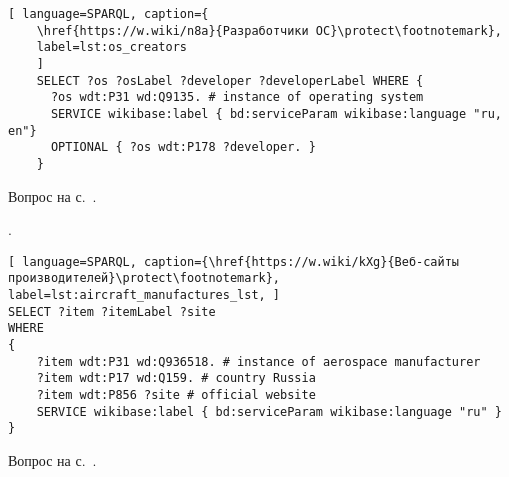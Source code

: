 \begin{task}
	\label{answer:what_system_created}
	
	\begin{lstlisting}[ language=SPARQL, caption={
	\href{https://w.wiki/n8a}{Разработчики ОС}\protect\footnotemark},
	label=lst:os_creators
	]
	SELECT ?os ?osLabel ?developer ?developerLabel WHERE {
	  ?os wdt:P31 wd:Q9135. # instance of operating system
	  SERVICE wikibase:label { bd:serviceParam wikibase:language "ru, en"}
	  OPTIONAL { ?os wdt:P178 ?developer. }
	}
	\end{lstlisting}
	
	\small{Вопрос на с.~\pageref{lst:inception_time_of_operating_systems}.}
\end{task}


\begin{task}
    \label{answer:aircraft_manufacturers}
    . 
    
	\begin{lstlisting}[ language=SPARQL, caption={\href{https://w.wiki/kXg}{Веб-сайты производителей}\protect\footnotemark}, label=lst:aircraft_manufactures_lst, ]
SELECT ?item ?itemLabel ?site
WHERE
{
    ?item wdt:P31 wd:Q936518. # instance of aerospace manufacturer
  	?item wdt:P17 wd:Q159. # country Russia
  	?item wdt:P856 ?site # official website
    SERVICE wikibase:label { bd:serviceParam wikibase:language "ru" }
}
\end{lstlisting}
    
    \small{Вопрос на с.~\pageref{lst:lang2}.}
\end{task}

